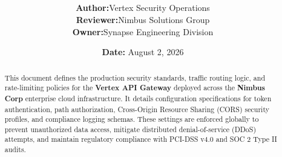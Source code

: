 \documentclass[11pt,a4paper]{article}
\title{
    \vspace{-2cm}
    \begin{tcolorbox}[
        colback=primary,
        colframe=primary,
        arc=0pt,
        outer arc=0pt,
        left=20pt,
        right=20pt,
        top=30pt,
        bottom=30pt,
        boxrule=0pt
    ]
        \color{white}
        \flushleft
        \noindent{\sffamily\LARGE\bfseries Vertex API Gateway Security \\ \& Configuration Specification} \\
        \vspace{0.5cm}
        \noindent{\sffamily\large Version 2.4.0 -- Production Release}
    \end{tcolorbox}
    \vspace{0.5cm}
}
\author{
    \sffamily
    \begin{tabular}{l l}
        \textbf{Author:} & Vertex Security Operations \\
        \textbf{Reviewer:} & Nimbus Solutions Group \\
        \textbf{Owner:} & Synapse Engineering Division \\
    \end{tabular}
}
\date{
    \sffamily
    \textbf{Date:} August 2, 2026
}
\begin{document}
\maketitle

\begin{abstract}
This document defines the production security standards, traffic routing logic, and rate-limiting policies for the \textbf{Vertex API Gateway} deployed across the \textbf{Nimbus Corp} enterprise cloud infrastructure. It details configuration specifications for token authentication, path authorization, Cross-Origin Resource Sharing (CORS) security profiles, and compliance logging schemas. These settings are enforced globally to prevent unauthorized data access, mitigate distributed denial-of-service (DDoS) attempts, and maintain regulatory compliance with PCI-DSS v4.0 and SOC 2 Type II audits.
\end{abstract}

\vspace{0.5cm}
\tableofcontents
\newpage







\newpage


\end{document}
